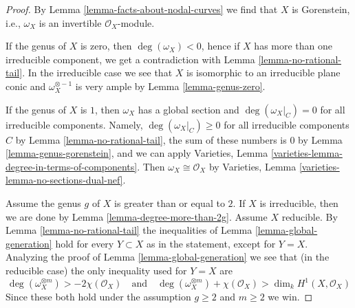 \documentclass[10pt,a4paper]{amsart}
\theoremstyle{plain}
\theoremstyle{definition}
\theoremstyle{remark}
\numberwithin{equation}{subsection}
\begin{document}
\begin{proof}
By Lemma \ref{lemma-facts-about-nodal-curves} we find that $X$ is
Gorenstein, i.e., $\omega_X$ is an invertible $\mathcal{O}_X$-module.

\medskip\noindent
If the genus of $X$ is zero, then $\deg(\omega_X) < 0$, hence if
$X$ has more than one irreducible component, we get a contradiction
with Lemma \ref{lemma-no-rational-tail}. In the irreducible case
we see that $X$ is isomorphic to an irreducible plane conic and
$\omega_X^{\otimes -1}$ is very ample by Lemma \ref{lemma-genus-zero}.

\medskip\noindent
If the genus of $X$ is $1$, then $\omega_X$ has a global section and
$\deg(\omega_X|_C) = 0$ for all irreducible components.
Namely, $\deg(\omega_X|_C) \geq 0$ for all irreducible components $C$
by Lemma \ref{lemma-no-rational-tail}, the sum of these numbers is
$0$ by Lemma \ref{lemma-genus-gorenstein}, and we can apply
Varieties, Lemma \ref{varieties-lemma-degree-in-terms-of-components}.
Then $\omega_X \cong \mathcal{O}_X$ by
Varieties, Lemma \ref{varieties-lemma-no-sections-dual-nef}.

\medskip\noindent
Assume the genus $g$ of $X$ is greater than or equal to $2$.
If $X$ is irreducible, then we are done by
Lemma \ref{lemma-degree-more-than-2g}.
Assume $X$ reducible.
By Lemma \ref{lemma-no-rational-tail} the
inequalities of Lemma \ref{lemma-global-generation}
hold for every $Y \subset X$ as in the statement, except for
$Y = X$. Analyzing the proof of Lemma \ref{lemma-global-generation}
we see that (in the reducible case) the only inequality
used for $Y = X$ are
$$
\deg(\omega_X^{\otimes m}) > -2 \chi(\mathcal{O}_X)
\quad\text{and}\quad
\deg(\omega_X^{\otimes m}) + \chi(\mathcal{O}_X) > \dim_k H^1(X, \mathcal{O}_X)
$$
Since these both hold under the assumption $g \geq 2$ and $m \geq 2$ we win.
\end{proof}
\end{document}
